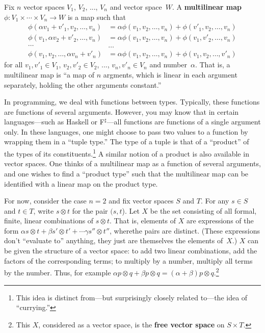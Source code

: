 \documentclass[10pt, a4paper, twocolumn]{article}
\newcommand{\defn}[1]{\textbf{#1}}
\begin{document}
Fix $n$ vector spaces $V_1$, $V_2$, ..., $V_n$ and vector space~$W$. A
\defn{multilinear map} $\phi:V_1\times\dotsb\times V_n \to W$ is a map such that
\begin{equation*}
  \begin{aligned}
  \phi(\alpha v_1 + v'_1, v_2, \dotsc, v_n) &= \alpha \phi(v_1, v_2, \dotsc, v_n) + \phi(v'_1, v_2,
  \dotsc, v_n) \\
  \phi(v_1, \alpha v_2 + v'_2, \dotsc, v_n) &= \alpha \phi(v_1, v_2, \dotsc, v_n) + \phi(v_1, v'_2,
  \dotsc, v_n) \\
  \dotsm &\dots \\
  \phi(v_1, v_2, \dotsc, \alpha v_n + v'_n) &= \alpha \phi(v_1, v_2, \dotsc, v_n) + \phi(v_1, v_2,
  \dotsc, v'_n)  
  \end{aligned}
  \end{equation*}
for all $v_1, v'_1\in V_1$, $v_2, v'_2 \in V_2$, ..., $v_n, v'_n \in V_n$ and
number~$\alpha$. That is, a multilinear map is “a map of $n$ argments, which is
linear in each argument separately, holding the other arguments constant.”

In programming, we deal with functions between types. Typically, these functions
are functions of several arguments. However, you may know that in certain
languages---such as Haskell or F$^\sharp$---all functions are functions of a single argument
only. In these languages, one might choose to pass two values to a function by
wrapping them in a “tuple type.” The type of a tuple is that of a “product” of
the types of its constituents.\footnote{This idea is distinct from---but
  surprisingly closely related to---the idea of “currying.”} A similar notion of a
product is also available in vector spaces. One thinks of a multilinear map as a
function of several arguments, and one wishes to find a “product type” such that
the multilinear map can be identified with a linear map on the product type.

For now, consider the case $n=2$ and fix vector spaces $S$ and $T$. For any $s\in
S$ and $t\in T$, write $s \otimes t$ for the pair $(s, t$). Let $X$ be the set
consisting of all formal, finite, linear combinations of $s \otimes t$. That is,
elements of $X$ are expressions of the form $\alpha s\otimes t + \beta s'\otimes t' + \dotsb \gamma s'' \otimes
t''$, wherethe pairs are distinct. (These expressions don't “evaluate to”
anything, they just are themselves the elements of~$X$.) $X$ can be given the
structure of a vector space: to add two linear combinations, add the factors of
the corresponding terms; to multiply by a number, multiply all terms by the
number. Thus, for example $\alpha p\otimes q + \beta p\otimes q = (\alpha + \beta) p\otimes q$.\footnote{This $X$,
  considered as a vector space, is the \defn{free vector space} on $S\times T$.}
\end{document}
